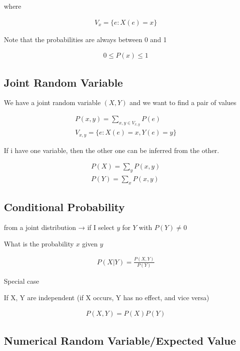 \documentclass[
]{article}
\begin{document}
where

\begin{gather*}
	V_x=\{e:X(e)=x\}
\end{gather*}

Note that the probabilities are always between 0 and 1

\begin{gather*}
	0\leq P(x)\leq 1
\end{gather*}

\subsection{Joint Random Variable}\label{joint-random-variables}

We have a joint random variable \((X,Y)\) and we want to find a pair of
values

\begin{gather*}
	P(x,y)=\sum_{x,y\in V_{x,y}}P(e)\\
	V_{x,y}=\{e:X(e)=x, Y(e)=y\}
\end{gather*}

If i have one variable, then the other one can be inferred from the
other.

\begin{gather*}
	P(X)=\sum_yP(x,y)\\
	P(Y)=\sum_xP(x,y)
\end{gather*}

\subsection{Conditional Probability}\label{conditional-probability}

from a joint distribution → if I select \(y\) for \(Y\) with
\(P(Y)\neq 0\)

What is the probability \(x\) given \(y\)

\begin{gather*}
	P(X|Y)=\frac{P(X,Y)}{P(Y)}
\end{gather*}

Special case

If X, Y are independent (if X occurs, Y has no effect, and vice versa)

\begin{gather*}
	P(X,Y)=P(X)P(Y)
\end{gather*}

\subsection{Numerical Random Variable/Expected
	Value}\label{numerical-random-variablesexpected-value}
\end{document}
